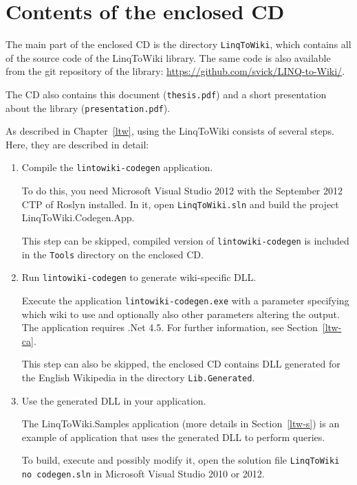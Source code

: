 \chapter{Contents of the enclosed CD}
\label{cd}

The main part of the enclosed CD is the directory \texttt{LinqToWiki},
which contains all of the source code of the LinqToWiki library.
The same code is also available from the git repository of the library:
\url{https://github.com/svick/LINQ-to-Wiki/}.

The CD also contains this document (\texttt{thesis.pdf})
and a short presentation about the library (\texttt{presentation.pdf}).


As described in Chapter~\ref{ltw}, using the LinqToWiki consists of several steps.
Here, they are described in detail:

\begin{enumerate}
\item Compile the \texttt{lintowiki-codegen} application.

To do this, you need Microsoft Visual Studio 2012 with the September 2012 \ac{CTP} of Roslyn installed.
In it, open \texttt{LinqToWiki.sln} and build the project LinqToWiki.Codegen.App.

This step can be skipped, compiled version of \texttt{lintowiki-codegen} is included
in the \texttt{Tools} directory on the enclosed CD.

\item Run \texttt{lintowiki-codegen} to generate wiki-specific \ac{DLL}.

Execute the application \texttt{lintowiki-codegen.exe} with a parameter specifying which wiki
to use and optionally also other parameters altering the output.
The application requires .Net 4.5.
For further information, see Section~\ref{ltw-ca}.

This step can also be skipped, the enclosed CD contains \ac{DLL} generated for the English Wikipedia
in the directory \texttt{Lib\string\LinqToWiki.Generated}.

\item Use the generated \ac{DLL} in your application.

The LinqToWiki.Samples application (more details in Section~\ref{ltw-s}) is an example of application
that uses the generated \ac{DLL} to perform queries.

To build, execute and possibly modify it, open the solution file \texttt{LinqToWiki no codegen.sln}
in Microsoft Visual Studio 2010 or 2012.
\end{enumerate}